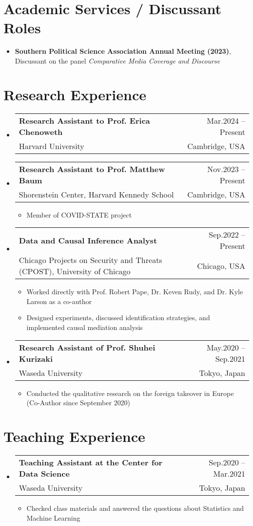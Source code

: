\documentclass[letterpaper,11pt]{article} %
\makeatletter
\newcommand{\CVItem}[1]{
  \item\small{
    {#1 \vspace{-2pt}}
  }
}
\newcommand{\CVSubheading}[4]{
  \vspace{-2pt}\item
    \begin{tabular*}{0.97\textwidth}[t]{l@{\extracolsep{\fill}}r}
      \textbf{#1} & #2 \\
      \small#3 & \small #4 \\
    \end{tabular*}\vspace{-7pt}
}
\newcommand{\CVSubHeadingListStart}{\begin{itemize}[leftmargin=0.5cm, label={}]}
\newcommand{\CVSubHeadingListEnd}{\end{itemize}}
\newcommand{\CVItemListStart}{\begin{itemize}}
\newcommand{\CVItemListEnd}{\end{itemize}\vspace{-5pt}}
\makeatother
\begin{document}
\section{Academic Services / Discussant Roles}
\begin{itemize}[leftmargin=0.5cm, label={}]
    \item{\textbf{Southern Political Science Association Annual Meeting (2023)}, Discussant on the panel \textit{Comparative Media Coverage and Discourse}}
\end{itemize}

\section{Research Experience}
\CVSubHeadingListStart
\CVSubheading
      {Research Assistant to Prof. Erica Chenoweth}{Mar.2024 -- Present}
      {Harvard University}{Cambridge, USA}

\CVSubheading
      {Research Assistant to Prof. Matthew Baum}{Nov.2023 -- Present}
      {Shorenstein Center, Harvard Kennedy School}{Cambridge, USA}
      \CVItemListStart
        \CVItem{Member of COVID-STATE project}
      \CVItemListEnd

\CVSubheading
      {Data and Causal Inference Analyst}{Sep.2022 -- Present}
      {Chicago Projects on Security and Threats (CPOST), University of Chicago}{Chicago, USA}
      \CVItemListStart
        \CVItem{Worked directly with Prof. Robert Pape, Dr. Keven Rudy, and Dr. Kyle Larson as a co-author}
        \CVItem{Designed experiments, discussed identification strategies, and implemented causal mediation analysis}
      \CVItemListEnd

    \CVSubheading
      {Research Assistant of Prof. Shuhei Kurizaki}{May.2020 -- Sep.2021}
      {Waseda University}{Tokyo, Japan}
      \CVItemListStart
        \CVItem{Conducted the qualitative research on the foreign takeover in Europe (Co-Author since September 2020)}
      \CVItemListEnd
\CVSubHeadingListEnd

\section{Teaching Experience}
\CVSubHeadingListStart
    \CVSubheading
      {Teaching Assistant at the Center for Data Science}{Sep.2020 -- Mar.2021}
      {Waseda University}{Tokyo, Japan}
      \CVItemListStart
        \CVItem {Checked class materials and answered the questions about Statistics and Machine Learning}
      \CVItemListEnd
  \CVSubHeadingListEnd
\end{document}
